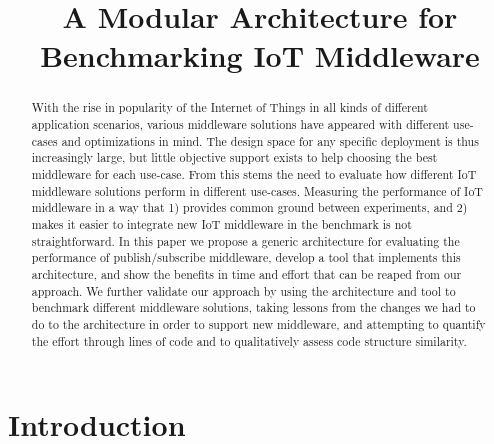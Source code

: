 \documentclass[conference]{IEEEtran}
\begin{document}
\title{A Modular Architecture for Benchmarking IoT Middleware}


\author{}


\maketitle

\begin{abstract}
  With the rise in popularity of the Internet of Things in all kinds of different application scenarios, various middleware solutions have appeared with different use-cases and optimizations in mind. The design space for any specific deployment is thus increasingly large, but little objective support exists to help choosing the best middleware for each use-case. From this stems the need to evaluate how different IoT middleware solutions perform in different use-cases. Measuring the performance of IoT middleware in a way that 1) provides common ground between experiments, and 2) makes it easier to integrate new IoT middleware in the benchmark is not straightforward. In this paper we propose a generic architecture for evaluating the performance of publish/subscribe middleware, develop a tool that implements this architecture, and show the benefits in time and effort that can be reaped from our approach. We further validate our approach by using the architecture and tool to benchmark different middleware solutions, taking lessons from the changes we had to do to the architecture in order to support new middleware, and attempting to quantify the effort through lines of code and to qualitatively assess code structure similarity. 
\end{abstract}

\section{Introduction}
\end{document}
